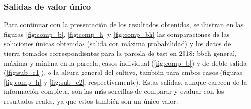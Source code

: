 \subsubsection{Salidas de valor único}
\par Para continuar con la presentación de los resultados obtenidos, se ilustran en las figuras \ref{fig:comp_b}, \ref{fig:comp_h} y \ref{fig:comp_bh} las comparaciones de las soluciones únicas obtenidas (salida con máxima probabilidad) y los datos de tierra tomados correspondientes para la parcela de test en 2018: \gls{bbch} general, máxima y mínima en la parcela, casos individual (\ref{fig:comp_b}) y de doble salida (\ref{fig:sub_c1}), o la altura general del cultivo, también para ambos casos (figuras \ref{fig:comp_h} y \ref{fig:sub_c2}, respectivamente). Estas salidas, aunque carecen de la información completa, son las más sencillas de comparar y evaluar con los resultados reales, ya que estos también son un único valor.  
\\

